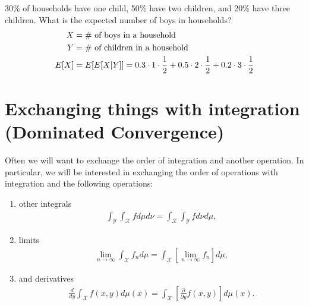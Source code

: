 \documentclass[twoside]{article}
\begin{document}
\begin{example}
30\% of households have one child, 50\% have two children, and 20\% have
three children. What is the expected number of boys in households?
\begin{align*}
  X &= \text{\# of boys in a household} \\
  Y &= \text{\# of children in a household} \\
  E[X] &= E[E[X | Y]]= 0.3 \cdot 1 \cdot \frac{1}{2} + 0.5 \cdot 2 \cdot 
  \frac{1}{2} + 0.2 \cdot 3 \cdot \frac{1}{2}
\end{align*}
\end{example}

\section{Exchanging things with integration (Dominated Convergence)}

Often we will want to exchange the order of integration and another operation.
In particular, we will be interested in exchanging the order of operations with
integration and the following operations:
\begin{enumerate}
  \item other integrals
    \begin{align*}
      \int_{\mathcal Y} \int_{\mathcal X} f d\mu d\nu = \int_{\mathcal X} \int_{\mathcal Y} f d\nu d\mu,
    \end{align*}
  \item limits
    \begin{align*}
      \lim_{n \rightarrow \infty} \int_{\mathcal X} f_n d\mu = \int_{\mathcal X} \left[
    \lim_{n \rightarrow \infty} f_n \right] d\mu,
    \end{align*}
  \item and derivatives
    \begin{align*}
      \frac{d}{dy} \int_{\mathcal X} f(x, y) d\mu(x) = \int_{\mathcal X}
    \left[\frac{\partial}{\partial y} f(x, y)\right] d\mu(x).
    \end{align*}
\end{enumerate}
\end{document}

